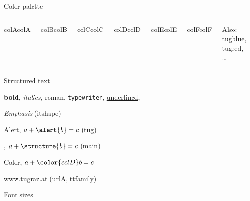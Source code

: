 \documentclass[table, aspectratio=169]{beamer}
\begin{document}
\begin{frame}{Color palette}
\begin{columns}[t]
      \begin{beamercolorbox}[colsep*=4pt]{colA}colA\end{beamercolorbox}
      \begin{beamercolorbox}[colsep*=4pt]{colB}colB\end{beamercolorbox}
      \begin{beamercolorbox}[colsep*=4pt]{colC}colC\end{beamercolorbox}
      \begin{beamercolorbox}[colsep*=4pt]{colD}colD\end{beamercolorbox}
      \begin{beamercolorbox}[colsep*=4pt]{colE}colE\end{beamercolorbox}
      \begin{beamercolorbox}[colsep*=4pt]{colF}colF\end{beamercolorbox}
      Also:
      \textcolor{tugblue}{tugblue},
      \textcolor{tugred}{tugred}, \dots
  \end{columns}
\end{frame}

\begin{frame}{Structured text}

  \textbf{bold}, \textit{italics}, \textrm{roman}, \texttt{typewriter}, \underline{underlined},
  \bigskip

  \emph{Emphasis} (itshape)
  \bigskip

  \alert{Alert},  $a + \alert{b} = c$ (tug)
  \bigskip

  ,  $a + \structure{b} = c$ (main)
  \bigskip
  
  \textcolor{colD}{Color},  $a + {\color{colD} b} = c$
  \bigskip

  \bigskip

  \url{www.tugraz.at} (urlA, ttfamily)
\end{frame}

\begin{frame}[fragile]{Font sizes}
  \begin{columns}
    \thefontsize[TINY]\TINY
    \thefontsize[Tiny]\Tiny
    \thefontsize[tiny]\tiny
    \thefontsize[scriptsize]\scriptsize
    \thefontsize[footnotesize]\footnotesize
    \thefontsize[small]\small
    \thefontsize[normalsize]\normalsize
    \thefontsize[large]\large

    \thefontsize[Large]\Large
    \thefontsize[LARGE]\LARGE
    \thefontsize[huge]\huge
    \thefontsize[Huge]\Huge
  \end{columns}
\end{frame}
\end{document}
